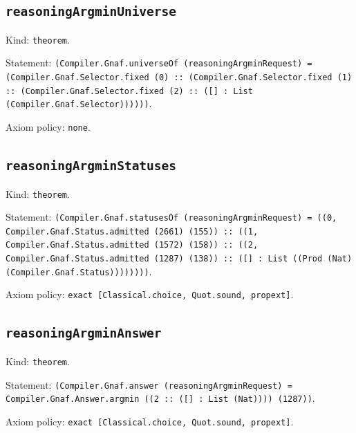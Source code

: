 \documentclass[11pt]{article}
\begin{document}
\subsection*{\texttt{reasoningArgminUniverse}}
\noindent Kind: \texttt{theorem}.\par
\noindent Statement: \texttt{(Compiler.Gnaf.universeOf (reasoningArgminRequest) = (Compiler.Gnaf.Selector.fixed (0) :: (Compiler.Gnaf.Selector.fixed (1) :: (Compiler.Gnaf.Selector.fixed (2) :: ([] : List (Compiler.Gnaf.Selector))))))}.\par
\noindent Axiom policy: \texttt{none}.\par
\subsection*{\texttt{reasoningArgminStatuses}}
\noindent Kind: \texttt{theorem}.\par
\noindent Statement: \texttt{(Compiler.Gnaf.statusesOf (reasoningArgminRequest) = ((0, Compiler.Gnaf.Status.admitted (2661) (155)) :: ((1, Compiler.Gnaf.Status.admitted (1572) (158)) :: ((2, Compiler.Gnaf.Status.admitted (1287) (138)) :: ([] : List ((Prod (Nat) (Compiler.Gnaf.Status))))))))}.\par
\noindent Axiom policy: \texttt{exact [Classical.choice, Quot.sound, propext]}.\par
\subsection*{\texttt{reasoningArgminAnswer}}
\noindent Kind: \texttt{theorem}.\par
\noindent Statement: \texttt{(Compiler.Gnaf.answer (reasoningArgminRequest) = Compiler.Gnaf.Answer.argmin ((2 :: ([] : List (Nat)))) (1287))}.\par
\noindent Axiom policy: \texttt{exact [Classical.choice, Quot.sound, propext]}.\par
\end{document}
